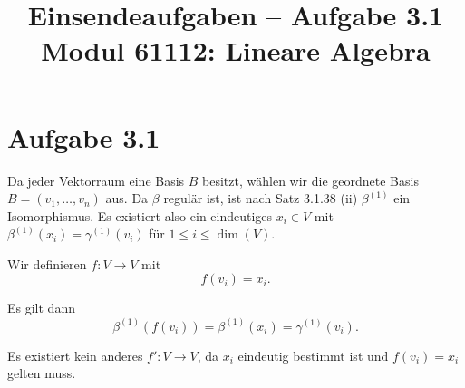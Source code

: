 \documentclass[a4paper,12pt]{article}
\title{Einsendeaufgaben -- Aufgabe 3.1\\[0.5em]
\large Modul 61112: Lineare Algebra}
\author{}
\date{}
\begin{document}
\maketitle

\section*{Aufgabe 3.1}

Da jeder Vektorraum eine Basis $B$ besitzt, wählen wir die geordnete Basis $B = (v_1, \ldots, v_n)$ aus. Da $\beta$ regulär ist, ist nach Satz 3.1.38 (ii) $\beta^{(1)}$ ein Isomorphismus. Es existiert also ein eindeutiges $x_i \in V$ mit $\beta^{(1)}(x_i) = \gamma^{(1)}(v_i)$ für $1 \leq i \leq \dim(V)$.

Wir definieren $f: V \to V$ mit
\[
  f(v_i) = x_i.
\]

Es gilt dann
\[
  \beta^{(1)}(f(v_i)) = \beta^{(1)}(x_i) = \gamma^{(1)}(v_i).
\]

Es existiert kein anderes $f': V \to V$, da $x_i$ eindeutig bestimmt ist und $f(v_i) = x_i$ gelten muss.
\end{document}
